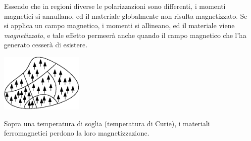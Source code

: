 \documentclass[10pt, letterpaper]{report}
\begin{document}
Essendo che in regioni diverse le polarizzazioni sono differenti, i momenti magnetici si annullano, ed il materiale globalmente non risulta magnetizzato. Se si applica un campo magnetico, i momenti si allineano, ed il materiale viene \textit{magnetizzato}, e tale effetto permeerà anche quando il campo magnetico che l'ha generato cesserà di esistere.
\begin{center}
    \includegraphics[width=0.3\textwidth ]{images/ferromagneti1.eps}
\end{center}
Sopra una temperatura di soglia (temperatura di Curie), i materiali ferromagnetici perdono la loro magnetizzazione.
\end{document}
